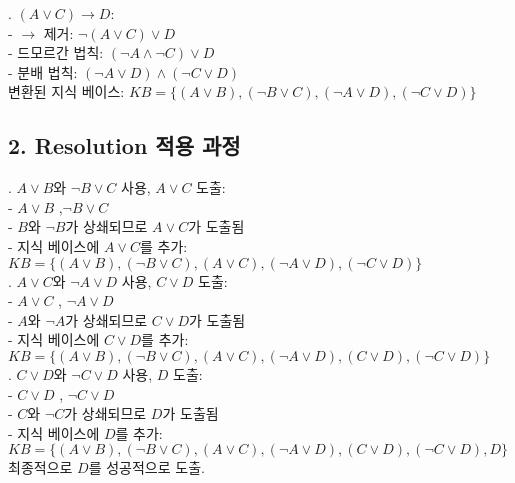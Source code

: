 \documentclass[12pt]{article}
\begin{document}
{. \( (A \lor C) \rightarrow D \): \\
   - \(\rightarrow\) 제거: \(\neg (A \lor C) \lor D\) \\
   - 드모르간 법칙: \((\neg A \land \neg C) \lor D\) \\
   - 분배 법칙: \((\neg A \lor D) \land (\neg C \lor D)\) \\

\noindent 변환된 지식 베이스: \( KB = \{(A \lor B), (\neg B \lor C), (\neg A \lor D), (\neg C \lor D) \} \)

\subsection*{2. Resolution 적용 과정}

. \( A \lor B \)와 \( \neg B \lor C \) 사용, \( A \lor C \) 도출: \\
   - \( A \lor B \) ,\( \neg B \lor C \) \\
   - \( B \)와 \( \neg B \)가 상쇄되므로 \( A \lor C \)가 도출됨 \\
   - 지식 베이스에 \( A \lor C \)를 추가: \( KB = \{(A \lor B), (\neg B \lor C), (A \lor C), (\neg A \lor D), (\neg C \lor D) \} \) \\

. \( A \lor C \)와 \( \neg A \lor D \) 사용, \( C \lor D \) 도출: \\
   - \( A \lor C \) , \( \neg A \lor D \) \\
   - \( A \)와 \( \neg A \)가 상쇄되므로 \( C \lor D \)가 도출됨 \\
   - 지식 베이스에 \( C \lor D \)를 추가: \( KB = \{(A \lor B), (\neg B \lor C), (A \lor C), (\neg A \lor D), (C \lor D), (\neg C \lor D) \} \) \\

. \( C \lor D \)와 \( \neg C \lor D \) 사용, \( D \) 도출: \\
   - \( C \lor D \) , \( \neg C \lor D \) \\
   - \( C \)와 \( \neg C \)가 상쇄되므로 \( D \)가 도출됨 \\
   - 지식 베이스에 \( D \)를 추가: \( KB = \{(A \lor B), (\neg B \lor C), (A \lor C), (\neg A \lor D), (C \lor D), (\neg C \lor D), D \} \)\\

\noindent 최종적으로 \(D\)를 성공적으로 도출.

}
\end{document}
